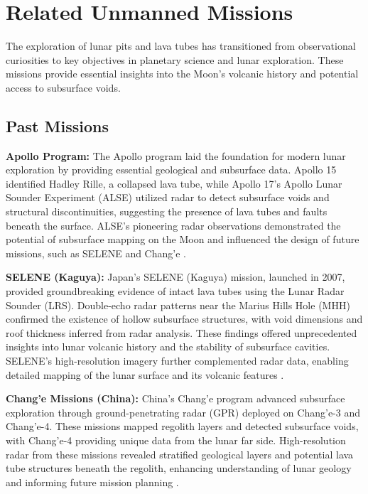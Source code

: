 \graphicspath{{img/ch5}}
\section{Related Unmanned Missions}

The exploration of lunar pits and lava tubes has transitioned from observational curiosities to key objectives in planetary science and lunar exploration. These missions provide essential insights into the Moon’s volcanic history and potential access to subsurface voids.

\subsection{Past Missions}

\textbf{Apollo Program:}  
The Apollo program laid the foundation for modern lunar exploration by providing essential geological and subsurface data. Apollo 15 identified Hadley Rille, a collapsed lava tube, while Apollo 17’s Apollo Lunar Sounder Experiment (ALSE) utilized radar to detect subsurface voids and structural discontinuities, suggesting the presence of lava tubes and faults beneath the surface. ALSE's pioneering radar observations demonstrated the potential of subsurface mapping on the Moon and influenced the design of future missions, such as SELENE and Chang’e \cite{radar-observations-lava-tubes}.

\textbf{SELENE (Kaguya):}  
Japan's SELENE (Kaguya) mission, launched in 2007, provided groundbreaking evidence of intact lava tubes using the Lunar Radar Sounder (LRS). Double-echo radar patterns near the Marius Hills Hole (MHH) confirmed the existence of hollow subsurface structures, with void dimensions and roof thickness inferred from radar analysis. These findings offered unprecedented insights into lunar volcanic history and the stability of subsurface cavities. SELENE’s high-resolution imagery further complemented radar data, enabling detailed mapping of the lunar surface and its volcanic features \cite{cavities-selene-lavatubes, radar-observations-lava-tubes}.

\textbf{Chang’e Missions (China):}  
China’s Chang’e program advanced subsurface exploration through ground-penetrating radar (GPR) deployed on Chang’e-3 and Chang’e-4. These missions mapped regolith layers and detected subsurface voids, with Chang’e-4 providing unique data from the lunar far side. High-resolution radar from these missions revealed stratified geological layers and potential lava tube structures beneath the regolith, enhancing understanding of lunar geology and informing future mission planning \cite{radar-observations-lava-tubes, cavities-selene-lavatubes}.



